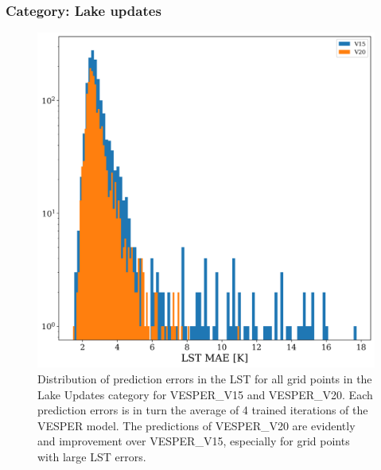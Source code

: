\documentclass[hess, twostagejnl]{copernicus}
\begin{document}
\subsubsection{Category: Lake updates}\label{sec:lake1}
\begin{figure}
	\includegraphics[width=\columnwidth]{lakes_histogram_plot}
	\caption{Distribution of prediction errors in the LST for all grid points in the Lake Updates category for VESPER\_V15 and VESPER\_V20.  Each prediction errors is in turn the average of 4 trained iterations of the VESPER model. The predictions of VESPER\_V20 are evidently and improvement over VESPER\_V15, especially for grid points with large LST errors.} 
	\label{fig:example_figure_histogram}
\end{figure}
\end{document}
